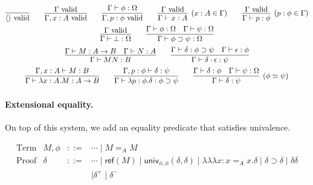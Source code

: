 \documentclass{easychair}
\newcommand{\vald}{\ \mathrm{valid}}
\newcommand{\univ}[4]{\mathsf{univ}_{{#1},{#2}} \left( {#3} , {#4} \right)}
\newcommand{\triplelambda}{\lambda \!\! \lambda \!\! \lambda}
\newcommand{\reff}[1]{\mathsf{ref} \left( {#1} \right)}
\begin{document}
\begin{gather*}
\infer{\langle \rangle \vald}{} \qquad
\infer{\Gamma, x : A \vald}{\Gamma \vald} \qquad 
\infer{\Gamma, p : \phi \vald}{\Gamma \vdash \phi : \Omega} \qquad
\infer[(x : A \in \Gamma)]{\Gamma \vdash x : A}{\Gamma \vald} \qquad
\infer[(p : \phi \in \Gamma)]{\Gamma \vdash p : \phi}{\Gamma \vald} \\
\infer{\Gamma \vdash \bot : \Omega}{\Gamma \vald} \qquad
\infer{\Gamma \vdash \phi \supset \psi : \Omega}{\Gamma \vdash \phi : \Omega \quad \Gamma \vdash \psi : \Omega} \\
\infer{\Gamma \vdash M N : B} {\Gamma \vdash M : A \rightarrow B \quad \Gamma \vdash N : A} \qquad
\infer{\Gamma \vdash \delta \cdot \epsilon : \psi} {\Gamma \vdash \delta : \phi \supset \psi \quad \Gamma \vdash \epsilon : \phi} \\
\infer{\Gamma \vdash \lambda x:A.M : A \rightarrow B}{\Gamma, x : A \vdash M : B} \qquad
\infer{\Gamma \vdash \lambda p : \phi . \delta : \phi \supset \psi}{\Gamma, p : \phi \vdash \delta : \psi} \qquad
\infer[(\phi \simeq \psi)]{\Gamma \vdash \delta : \psi}{\Gamma \vdash \delta : \phi \quad \Gamma \vdash \psi : \Omega}
\end{gather*}

\paragraph{Extensional equality.}

On top of this system, we add an equality predicate that satisfies univalence.

\[
\begin{array}{lrcl}
\text{Term} & M , \phi & ::= & \cdots \mid M =_A M \\
\text{Proof} & \delta & ::= & \cdots \mid \reff{M} \mid \univ{\phi}{\phi}{\delta}{\delta} \mid \triplelambda x : x =_A x . \delta \mid \delta \supset \delta \mid \delta \delta \\
 & & & \mid \delta^+ \mid \delta^-
\end{array} \]
\end{document}

